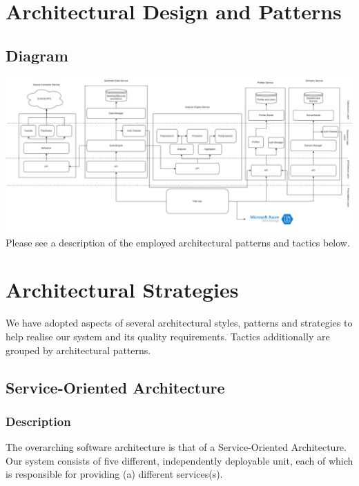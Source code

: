 \documentclass[12pt]{article}
\begin{document}
\section{Architectural Design and Patterns}
\subsection{Diagram}
\includegraphics[width=1\textwidth]{Demo3Architecture.jpg}
Please see a description of the employed architectural patterns and tactics below.


\newpage
\section{Architectural Strategies}
We have adopted aspects of several architectural styles, patterns and strategies to help realise our system and its quality requirements. Tactics additionally are grouped by architectural patterns.
\subsection{Service-Oriented Architecture}
\subsubsection{Description}
The overarching software architecture is that of a Service-Oriented Architecture. Our system consists of five different, independently deployable unit, each of which is responsible for providing (a) different services(s).
\end{document}
